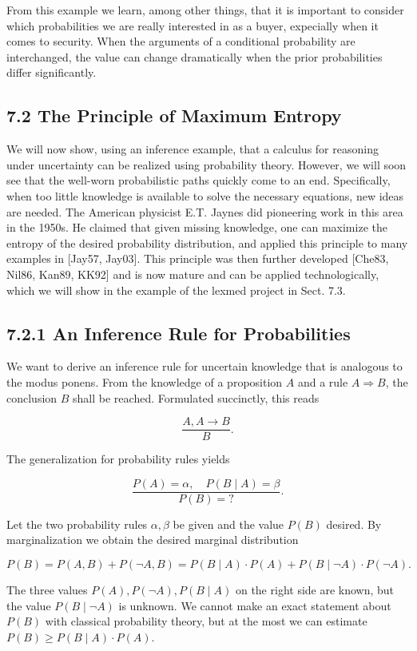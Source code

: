 \documentclass[10pt]{article}
\begin{document}
From this example we learn, among other things, that it is important to consider which probabilities we are really interested in as a buyer, expecially when it comes to security. When the arguments of a conditional probability are interchanged, the value can change dramatically when the prior probabilities differ significantly.

\subsection*{7.2 The Principle of Maximum Entropy}
We will now show, using an inference example, that a calculus for reasoning under uncertainty can be realized using probability theory. However, we will soon see that the well-worn probabilistic paths quickly come to an end. Specifically, when too little knowledge is available to solve the necessary equations, new ideas are needed. The American physicist E.T. Jaynes did pioneering work in this area in the 1950s. He claimed that given missing knowledge, one can maximize the entropy of the desired probability distribution, and applied this principle to many examples in [Jay57, Jay03]. This principle was then further developed [Che83, Nil86, Kan89, KK92] and is now mature and can be applied technologically, which we will show in the example of the lexmed project in Sect. 7.3.

\subsection*{7.2.1 An Inference Rule for Probabilities}
We want to derive an inference rule for uncertain knowledge that is analogous to the modus ponens. From the knowledge of a proposition $A$ and a rule $A \Rightarrow B$, the conclusion $B$ shall be reached. Formulated succinctly, this reads

$$
\frac{A, A \rightarrow B}{B} .
$$

The generalization for probability rules yields

$$
\frac{P(A)=\alpha, \quad P(B \mid A)=\beta}{P(B)=?} .
$$

Let the two probability rules $\alpha, \beta$ be given and the value $P(B)$ desired. By marginalization we obtain the desired marginal distribution

$$
P(B)=P(A, B)+P(\neg A, B)=P(B \mid A) \cdot P(A)+P(B \mid \neg A) \cdot P(\neg A) .
$$

The three values $P(A), P(\neg A), P(B \mid A)$ on the right side are known, but the value $P(B \mid \neg A)$ is unknown. We cannot make an exact statement about $P(B)$ with classical probability theory, but at the most we can estimate $P(B) \geq P(B \mid A) \cdot P(A)$.
\end{document}

